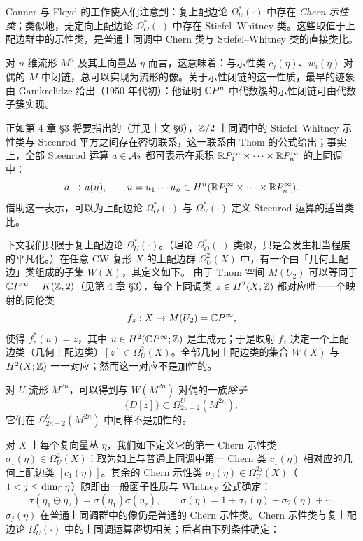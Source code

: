 Conner 与 Floyd 的工作使人们注意到：复上配边论 $\Omega_U^*(\cdot)$ 中存在 \emph{Chern 示性类}；类似地，无定向上配边论 $\Omega_O^*(\cdot)$ 中存在 Stiefel--Whitney 类。这些取值于上配边群中的示性类，是普通上同调中 Chern 类与 Stiefel--Whitney 类的直接类比。

对 $n$ 维流形 $M^n$ 及其上向量丛 $\eta$ 而言，这意味着：与示性类 $c_j(\eta)$、$w_i(\eta)$ 对偶的 $M$ 中闭链，总可以实现为流形的像。关于示性闭链的这一性质，最早的迹象由 Gamkrelidze 给出（1950 年代初）：他证明 $\mathbb{C}P^n$ 中代数簇的示性闭链可由代数子簇实现。

正如第 4 章 §3 将要指出的（并见上文 §6），$\mathbb{Z}/2$-上同调中的 Stiefel--Whitney 示性类与 Steenrod 平方之间存在密切联系，这一联系由 Thom 的公式给出；事实上，全部 Steenrod 运算 $a\in\mathcal{A}_2$ 都可表示在乘积 $\mathbb{R}P_1^\infty\times\cdots\times\mathbb{R}P_n^\infty$ 的上同调中：
\[
a\mapsto a(u),\qquad u=u_1\cdots u_n\in H^n(\mathbb{R}P_1^\infty\times\cdots\times\mathbb{R}P_n^\infty).
\]
借助这一表示，可以为上配边论 $\Omega_O^*(\cdot)$ 与 $\Omega_U^*(\cdot)$ 定义 Steenrod 运算的适当类比。

下文我们只限于复上配边论 $\Omega_U^*(\cdot)$。（理论 $\Omega_O^*(\cdot)$ 类似，只是会发生相当程度的平凡化。）在任意 CW 复形 $X$ 的上配边群 $\Omega_U^2(X)$ 中，有一个由「几何上配边」类组成的子集 $W(X)$，其定义如下。
由于 Thom 空间 $M(U_2)$ 可以等同于 $\mathbb{C}P^\infty=K(\mathbb{Z},2)$（见第 4 章 §3），每个上同调类 $z\in H^2(X;\mathbb{Z})$ 都对应唯一一个映射的同伦类
\[
f_z:X\to M(U_2)=\mathbb{C}P^\infty,
\]
使得 $f_z^*(u)=z$，其中 $u\in H^2(\mathbb{C}P^\infty;\mathbb{Z})$ 是生成元；于是映射 $f_z$ 决定一个上配边类（几何上配边类）$[z]\in\Omega_U^2(X)$。全部几何上配边类的集合 $W(X)$ 与 $H^2(X;\mathbb{Z})$ 一一对应；然而这一对应不是加性的。

对 $U$-流形 $M^{2n}$，可以得到与 $W(M^{2n})$ 对偶的一族\emph{除子}
\[
\{D[z]\}\subset\Omega_{2n-2}^U(M^{2n}),
\]
它们在 $\Omega_{2n-2}^U(M^{2n})$ 中同样不是加性的。

对 $X$ 上每个复向量丛 $\eta$，我们如下定义它的第一 Chern 示性类 $\sigma_1(\eta)\in\Omega_U^2(X)$：取为如上与普通上同调中第一 Chern 类 $c_1(\eta)$ 相对应的几何上配边类 $[c_1(\eta)]$。其余的 Chern 示性类 $\sigma_j(\eta)\in\Omega_U^{2j}(X)$（$1<j\le\dim_{\mathbb{C}}\eta$）随即由一般函子性质与 Whitney 公式确定：
\begin{equation}
\sigma(\eta_1\oplus\eta_2)=\sigma(\eta_1)\sigma(\eta_2),\qquad \sigma(\eta)=1+\sigma_1(\eta)+\sigma_2(\eta)+\cdots. \tag{9.5}
\end{equation}
$\sigma_j(\eta)$ 在普通上同调群中的像仍是普通的 Chern 示性类。Chern 示性类与复上配边论 $\Omega_U^*(\cdot)$ 中的上同调运算密切相关；后者由下列条件确定：

